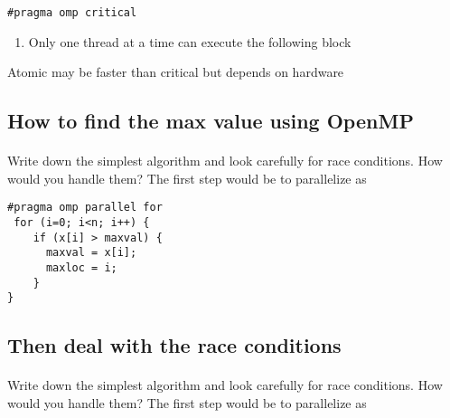 \noindent


\begin{verbatim}
#pragma omp critical

\end{verbatim}

\begin{enumerate}
\item Only one thread at a time can execute the following block
\end{enumerate}

\noindent
Atomic may be faster than critical but depends on hardware



\subsection*{How to find the max value using OpenMP}

\paragraph{}
Write down the simplest algorithm and look carefully for race conditions. How would you handle them? 
The first step would be to parallelize as 








\begin{verbatim}
#pragma omp parallel for
 for (i=0; i<n; i++) {
    if (x[i] > maxval) {
      maxval = x[i];
      maxloc = i; 
    }
}

\end{verbatim}



\subsection*{Then deal with the race conditions}

\paragraph{}
Write down the simplest algorithm and look carefully for race conditions. How would you handle them? 
The first step would be to parallelize as 











